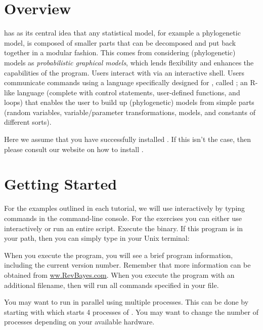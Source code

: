 
\section{Overview}

\RevBayes has as its central idea that any statistical model, for example a phylogenetic model, is composed of smaller parts that can be decomposed and put back together in a modular fashion. This comes from considering (phylogenetic) models as \textit{probabilistic graphical models}, which lends flexibility and enhances the capabilities of the program. 
Users interact with \RevBayes via an interactive shell.
Users communicate commands using a language specifically designed for \RevBayes, called \Rev; an R-like language (complete with control statements, user-defined functions, and loops) that enables the user to build up (phylogenetic) models from simple parts (random variables, variable/parameter transformations, models, and constants of different sorts).
 
Here we assume that you have successfully installed \RevBayes.
If this isn't the case, then please consult our website on how to install \RevBayes.



\bigskip
\section{Getting Started}

For the examples outlined in each tutorial, we will use \RevBayes interactively by typing commands in the command-line console.
For the exercises you can either use \RevBayes interactively or run an entire script.
Execute the \RevBayes binary. If this program is in your path, then you can simply type in your Unix terminal:


When you execute the program, you will see a brief program information, including the current version number. 
Remember that more information can be obtained from \href{www.RevBayes.com}{ww.RevBayes.com}.
When you execute the program with an additional filename, \EG
{}
then \RevBayes will run all commands specified in your file.

You may want to run \RevBayes in parallel using multiple processes.
This can be done by starting \RevBayes with
which starts 4 processes of \RevBayes.
You may want to change the number of processes depending on your available hardware.

